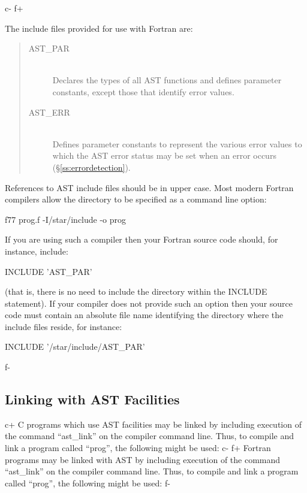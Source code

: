 \documentclass[twoside,11pt]{starlink}
\providecommand{\secref}[1]{\S\ref{#1}}
\begin{document}
c-
f+

The include files provided for use with Fortran are:

\begin{quote}
\begin{description}
\item[AST\_PAR]\mbox{}\\
Declares the types of all AST functions and defines parameter
constants, except those that identify error values.

\item[AST\_ERR]\mbox{}\\
Defines parameter constants to represent the various error values to
which the AST error status may be set when an error occurs
(\secref{ss:errordetection}).
\end{description}
\end{quote}

References to AST include files should be in upper case. Most modern
Fortran compilers allow the directory to be specified as a command line
option:

\small
\begin{terminalv}
f77 prog.f -I/star/include -o prog
\end{terminalv}
\normalsize

If you are using such a compiler then your Fortran source code should,
for instance, include:

\small
\begin{terminalv}
      INCLUDE 'AST_PAR'
\end{terminalv}
\normalsize

(that is, there is no need to include the directory within the INCLUDE
statement). If your compiler does not provide such an option then your
source code must contain an absolute file name identifying the directory
where the include files reside, for instance:

\small
\begin{terminalv}
      INCLUDE '/star/include/AST_PAR'
\end{terminalv}
\normalsize

f-

\subsection{\label{ss:linking}Linking with AST Facilities}

c+
C programs which use AST facilities may be linked by including
execution of the command ``ast\_link'' on the compiler command
line. Thus, to compile and link a program called ``prog'', the
following might be used:
c-
f+
Fortran programs may be linked with AST by including execution of the
command ``ast\_link'' on the compiler command line. Thus, to compile
and link a program called ``prog'', the following might be used:
f-
\end{document}
